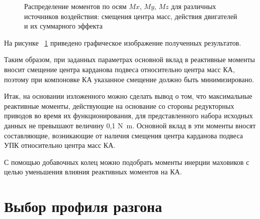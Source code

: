 \begin{figure}[ht]
	
	\caption{Распределение моментов по осям $Mx$, $My$, $Mz$ для различных источников воздействия: смещения центра масс, действия двигателей и их суммарного эффекта}
	\label{fig:momentBars}
\end{figure}

На рисунке ~\cref{fig:momentBars} приведено графическое изображение полученных результатов.

Таким образом, при заданных параметрах основной вклад в реактивные моменты вносит смещение центра карданова подвеса относительно центра масс КА, поэтому при компоновке КА указанное смещение должно быть минимизировано.

Итак, на основании изложенного можно сделать вывод о том, что максимальные реактивные моменты, действующие на основание со стороны редукторных приводов во время их функционирования, для представленного набора исходных данных не превышают величину 0,1 \si{\newton\metre}.  Основной вклад в эти моменты вносят составляющие, возникающие от наличия смещения центра карданова подвеса УПК относительно центра масс КА.

С помощью добавочных колец можно подобрать моменты инерции маховиков с целью уменьшения влияния реактивных моментов на КА.








\section{Выбор профиля разгона}

